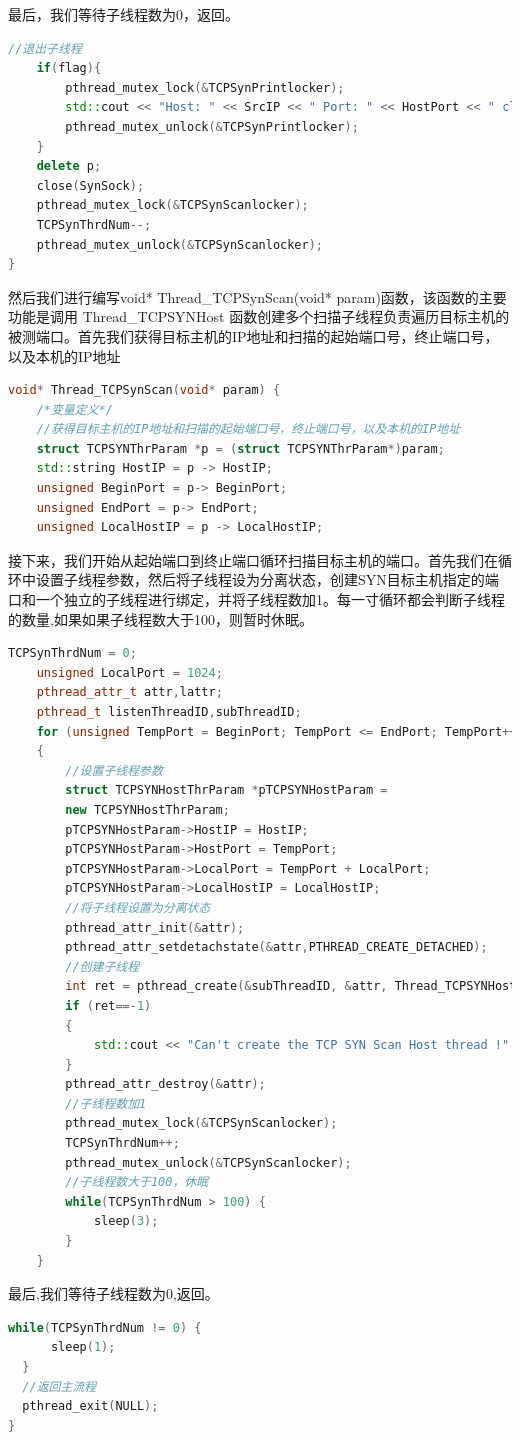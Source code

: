\documentclass[UTF8,a4paper,10pt]{ctexart}
\begin{document}
最后，我们等待子线程数为0，返回。
\begin{lstlisting}[language = C++]
   //退出子线程
    if(flag){
        pthread_mutex_lock(&TCPSynPrintlocker);
        std::cout << "Host: " << SrcIP << " Port: " << HostPort << " closed !" << std::endl;
        pthread_mutex_unlock(&TCPSynPrintlocker);
    }
    delete p;
    close(SynSock);
    pthread_mutex_lock(&TCPSynScanlocker);
    TCPSynThrdNum--;
    pthread_mutex_unlock(&TCPSynScanlocker);
}
\end{lstlisting}
然后我们进行编写void* Thread\_TCPSynScan(void* param)函数，该函数的主要功能是调用 Thread\_TCPSYNHost 函数创建多个扫描子线程负责遍历目标主机的被测端口。首先我们获得目标主机的IP地址和扫描的起始端口号，终止端口号，以及本机的IP地址
\begin{lstlisting}[language = C++]
   void* Thread_TCPSynScan(void* param) {
    /*变量定义*/
    //获得目标主机的IP地址和扫描的起始端口号，终止端口号，以及本机的IP地址
    struct TCPSYNThrParam *p = (struct TCPSYNThrParam*)param;
    std::string HostIP = p -> HostIP;
    unsigned BeginPort = p-> BeginPort;
	unsigned EndPort = p-> EndPort;
	unsigned LocalHostIP = p -> LocalHostIP;
\end{lstlisting}
接下来，我们开始从起始端口到终止端口循环扫描目标主机的端口。首先我们在循环中设置子线程参数，然后将子线程设为分离状态，创建SYN目标主机指定的端口和一个独立的子线程进行绑定，并将子线程数加1。每一寸循环都会判断子线程的数量,如果如果子线程数大于100，则暂时休眠。
\begin{lstlisting}[language = C++]
   TCPSynThrdNum = 0;
    unsigned LocalPort = 1024;
    pthread_attr_t attr,lattr;
    pthread_t listenThreadID,subThreadID;
    for (unsigned TempPort = BeginPort; TempPort <= EndPort; TempPort++)
    {
        //设置子线程参数
        struct TCPSYNHostThrParam *pTCPSYNHostParam =
        new TCPSYNHostThrParam;
        pTCPSYNHostParam->HostIP = HostIP;
        pTCPSYNHostParam->HostPort = TempPort;
        pTCPSYNHostParam->LocalPort = TempPort + LocalPort;
        pTCPSYNHostParam->LocalHostIP = LocalHostIP;
        //将子线程设置为分离状态
        pthread_attr_init(&attr);
        pthread_attr_setdetachstate(&attr,PTHREAD_CREATE_DETACHED);
        //创建子线程
        int ret = pthread_create(&subThreadID, &attr, Thread_TCPSYNHost, pTCPSYNHostParam);
        if (ret==-1) 
		{
			std::cout << "Can't create the TCP SYN Scan Host thread !" << std::endl;
		}
        pthread_attr_destroy(&attr);
        //子线程数加1
        pthread_mutex_lock(&TCPSynScanlocker);
        TCPSynThrdNum++;
        pthread_mutex_unlock(&TCPSynScanlocker);
        //子线程数大于100，休眠
        while(TCPSynThrdNum > 100) { 
            sleep(3); 
        }
    }
\end{lstlisting}
最后,我们等待子线程数为0,返回。
\begin{lstlisting}[language = C++]
   while(TCPSynThrdNum != 0) { 
      sleep(1);
  }
  //返回主流程
  pthread_exit(NULL);
}  
\end{lstlisting}
\end{document}
